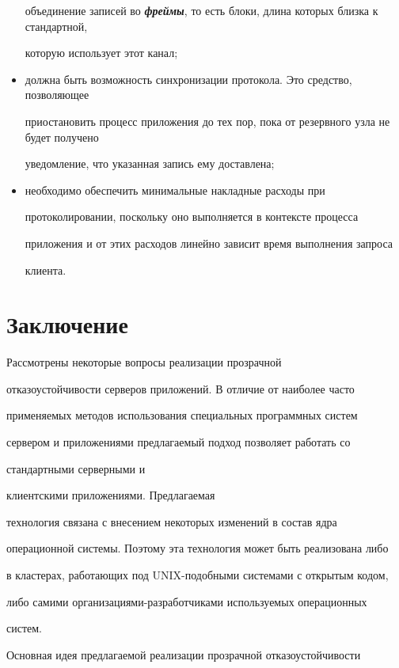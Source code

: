\begin{multicols}{2}
\begin{itemize}
объединение записей во {\bfseries\textit{фреймы}}, то есть блоки, длина которых близка к стандартной,

которую использует этот канал;

\item должна быть возможность синхронизации протокола. Это средство, позволяющее

приостановить процесс приложения до тех пор, пока от резервного узла не будет получено

уведомление, что указанная запись ему доставлена;

\item необходимо обеспечить минимальные накладные расходы при

протоколировании, поскольку оно выполняется в контексте процесса

приложения и от этих расходов линейно зависит время выполнения запроса

клиента.

\end{itemize}



\section{Заключение}



Рассмотрены некоторые вопросы реализации прозрачной

отказоустойчивости серверов при\-ло\-же\-ний. В отличие от наиболее час\-то

при\-ме\-ня\-емых методов использования специальных програм\-мных систем

сервером и приложениями предлагаемый подход позволяет работать со

стандартными серверными и

 клиентскими приложениями. Пред\-лага\-емая

тех\-нология  связана с внесением некоторых изменений в состав ядра

операционной системы. Поэтому эта технология может быть реализована либо

в кластерах, работающих под UNIX-подобными системами с открытым кодом,

либо самими организациями-разработчиками используемых операционных

систем.



Основная идея предлагаемой реализации прозрачной отказоустойчивости


\end{multicols}
